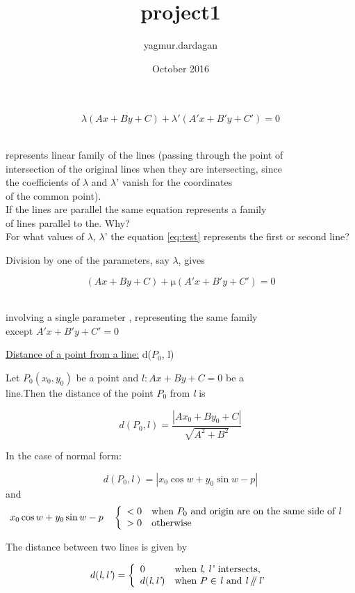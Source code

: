 \documentclass[reqno]{amsbook}
\title{project1}
\author{yagmur.dardagan }
\date{October 2016}
\begin{document}

\begin{equation}\label{eq:test}
    \lambda(Ax + By + C) + \lambda'(A'x + B'y + C') = 0 \tag{1}
\end{equation}
  


\noindent \\represents linear family of the lines (passing through the point of \\
intersection of the original lines when they are intersecting, 
since \\the coefficients of $\lambda$ and $\lambda$' vanish for the coordinates \\
of the common point).\\
\indent If the lines are parallel the same equation  represents a 
family \\of lines parallel to the. Why? \\
\indent For what values of $\lambda$, $\lambda$' the equation \ref{eq:test} represents the first or second line?

\bigskip Division by one of the parameters, say $\lambda$, gives

    $$(Ax + By + C) +\si{\micro} (A'x + B'y + C') = 0$$


\noindent \\involving a single parameter \si{\micro} , representing the same family \\ except $A'x + B'y + C' = 0$

\bigskip \underline{Distance of a point from a line:} d($P_0$, l)  

\bigskip Let $P_0(x_0, y_0)$ be a point and $ \textit{l}: Ax + By + C = 0$ be a \\
line.Then the distance of the point $P_0$ from \textit{l} is 

    $$d(P_0, \textit{l}) = \frac{|Ax_0 + By_0 + C|}{\sqrt{A^2 + B^2}}$$



\bigskip In the case of normal form: 

    $$d(P_0, \textit{l}) = | x_0\cos{w} + y_0\sin{w} - p|$$
and
\begin{displaymath}
    x_0\cos{w} + y_0\sin{w} - p \quad
    \left\{ \begin{array}{ll}
        < 0  & \textrm{when $P_0$ and origin are on the same side of \textit{l} }\\
         > 0  & \textrm{otherwise}
    \end{array} \right.
\end{displaymath}

\indent The distance between two lines is given by


\newcommand{\parallelsum}{\mathbin{\!/\mkern-5mu/\!}}
\begin{displaymath}
 d(\textit{l}, \textit{l'})=
\left\{ \begin{array}{ll}
  0  & \textrm{when \textit{l}, \textit{l'} intersects,}\\
  d(\textit{l}, \textit{l'})  & \textrm{when $P \in\ $\textit{l} and \textit{l} $ \parallelsum$ \textit{l}'}
\end{array} \right.
\end{displaymath}
    
\end{document}
